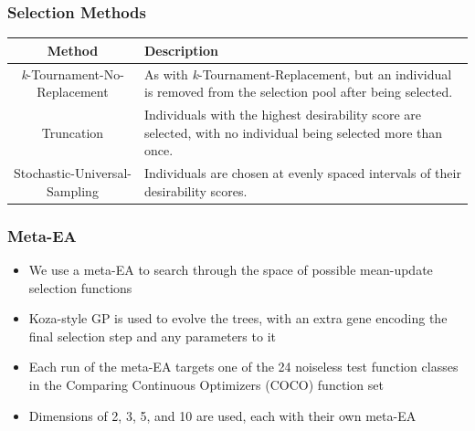 \documentclass{beamer}
\begin{document}
\begin{frame}
\frametitle{Selection Methods}
\begin{table}
	\centering
	\label{tab:selection_methods}
	\begin{tabular}{c|p{5cm}}
		\hline
		Method & Description\\
		\hline
		\textit{k}-Tournament-No-Replacement & As with \textit{k}-Tournament-Replacement, but an individual is removed from the selection pool after being selected.\\
		\hline
		Truncation & Individuals with the highest desirability score are selected, with no individual being selected more than once. \\
		\hline
		Stochastic-Universal-Sampling & Individuals are chosen at evenly spaced intervals of their desirability scores. \\
		
		\hline
	\end{tabular}
\end{table}
\end{frame}	
	
	\begin{frame}
		\frametitle{Meta-EA}
		
		\begin{itemize}
			 \item<1-|alert@1> We use a meta-EA to search through the space of possible mean-update selection functions
			 \item<2-|alert@2> Koza-style GP is used to evolve the trees, with an extra gene encoding the final selection step and any parameters to it	 
			 \item<3-|alert@3> Each run of the meta-EA targets one of the 24 noiseless test function classes in the Comparing Continuous Optimizers (COCO) function set
 			 \item<4-|alert@4> Dimensions of 2, 3, 5, and 10 are used, each with their own meta-EA
		\end{itemize}
	\end{frame}
\end{document}
